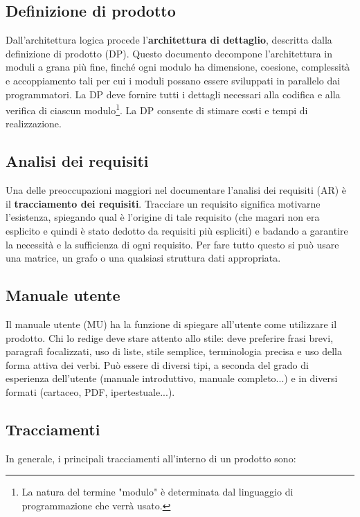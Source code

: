 \documentclass[a4paper]{article}
\begin{document}
		
	\subsection{Definizione di prodotto}

		
Dall'architettura logica procede l'\textbf{architettura di dettaglio}, descritta dalla definizione di prodotto (DP). Questo documento decompone l'architettura in moduli a grana più fine, finché ogni modulo ha dimensione, coesione, complessità e accoppiamento tali per cui i moduli possano essere sviluppati in parallelo dai programmatori. La DP deve fornire tutti i dettagli necessari alla codifica e alla verifica di ciascun modulo\footnote{La natura del termine "modulo" è determinata dal linguaggio di programmazione che verrà usato.}. La DP consente di stimare costi e tempi di realizzazione.

		
	\subsection{Analisi dei requisiti}

		
Una delle preoccupazioni maggiori nel documentare l'analisi dei requisiti (AR) è il \textbf{tracciamento dei requisiti}. Tracciare un requisito significa motivarne l'esistenza, spiegando qual è l'origine di tale requisito (che magari non era esplicito e quindi è stato dedotto da requisiti più espliciti) e badando a garantire la necessità e la sufficienza di ogni requisito. Per fare tutto questo si può usare una matrice, un grafo o una qualsiasi struttura dati appropriata.

		
	\subsection{Manuale utente}

		
Il manuale utente (MU) ha la funzione di spiegare all'utente come utilizzare il prodotto. Chi lo redige deve stare attento allo stile: deve preferire frasi brevi, paragrafi focalizzati, uso di liste, stile semplice, terminologia precisa e uso della forma attiva dei verbi. Può essere di diversi tipi, a seconda del grado di esperienza dell'utente (manuale introduttivo, manuale completo...) e in diversi formati (cartaceo, PDF, ipertestuale...).

		
	\subsection{Tracciamenti}

		
In generale, i principali tracciamenti all'interno di un prodotto sono:
		
\end{document}
